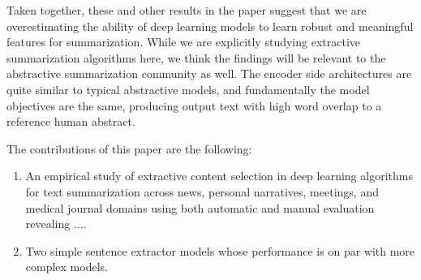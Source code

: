 %
%


Taken together, these and other results in the paper suggest that we are 
overestimating the ability of deep learning models to learn robust and 
meaningful features for summarization. 
While we are explicitly studying extractive summarization algorithms here,
we think the findings will be relevant to the abstractive summarization 
community as well. The encoder side architectures are quite similar to
typical abstractive models, and fundamentally the model objectives are 
the same, producing output text with high word overlap to a reference human
abstract. 

The contributions of this paper are the following:
\begin{enumerate}
    \item An empirical study of extractive content selection in 
        deep learning 
        algorithms for text summarization across news, personal narratives, 
         meetings, and
         medical journal domains using both automatic and manual evaluation revealing ....

    \item Two simple sentence extractor models whose performance is 
          on par 
          with more complex models.
\end{enumerate}

